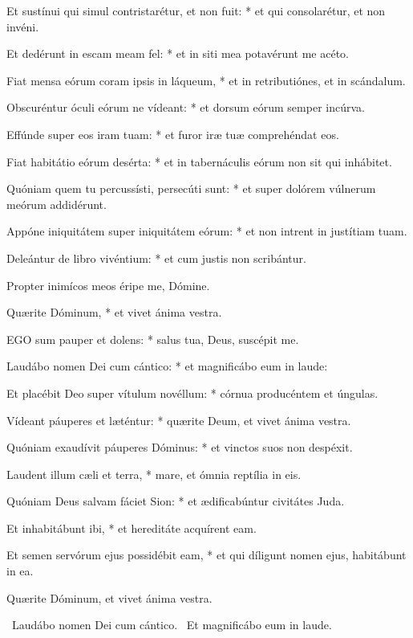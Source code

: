 Et sustínui qui simul contristarétur, et non fuit: * et qui consolarétur, et non invéni.

Et dedérunt in escam meam fel: * et in siti mea potavérunt me acéto.

Fiat mensa eórum coram ipsis in láqueum, * et in retributiónes, et in scándalum.

Obscuréntur óculi eórum ne vídeant: * et dorsum eórum semper incúrva.

Effúnde super eos iram tuam: * et furor iræ tuæ comprehéndat eos.

Fiat habitátio eórum desérta: * et in tabernáculis eórum non sit qui inhábitet.

Quóniam quem tu percussísti, persecúti sunt: * et super dolórem vúlnerum meórum addidérunt.

Appóne iniquitátem super iniquitátem eórum: * et non intrent in justítiam tuam.

Deleántur de libro vivéntium: * et cum justis non scribántur.

 Propter inimícos meos éripe me, Dómine.

 Quærite Dóminum, * et vivet ánima vestra.


\lettrine[lines=2]{E}{GO} sum pauper et dolens: * salus tua, Deus, suscépit me.

Laudábo nomen Dei cum cántico: * et magnificábo eum in laude:

Et placébit Deo super vítulum novéllum: * córnua producéntem et úngulas.

Vídeant páuperes et læténtur: * quærite Deum, et vivet ánima vestra.

Quóniam exaudívit páuperes Dóminus: * et vinctos suos non despéxit.

Laudent illum cæli et terra, * mare, et ómnia reptília in eis.

Quóniam Deus salvam fáciet Sion: * et ædificabúntur civitátes Juda.

Et inhabitábunt ibi, * et hereditáte acquírent eam.

Et semen servórum ejus possidébit eam, * et qui díligunt nomen ejus, habitábunt in ea.

 Quærite Dóminum, et vivet ánima vestra.


\V\ Laudábo nomen Dei cum cántico. \R\ Et magnificábo eum in laude.

